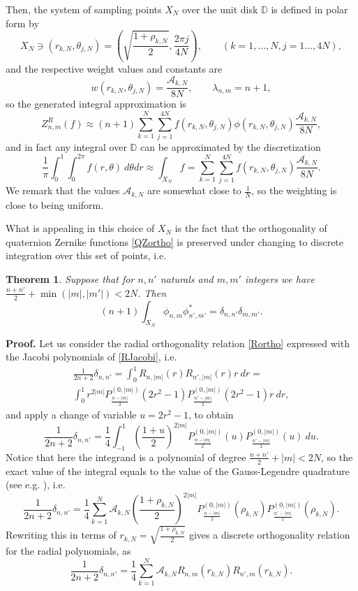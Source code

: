 \documentclass[12pt]{article}
\newtheorem{theorem}{\noindent Theorem}
\newcommand{\D}{\mathbb{D}}
\begin{document}
Then, the system of sampling points $X_N$ over the unit disk $\D$ is defined in polar form by
\[
	X_N\ni (r_{k,N}, \theta_{j,N}) = \left(\sqrt{\frac{1+\rho_{k,N}}{2}} , \frac{2\pi j}{4N} \right), \qquad (k=1,\ldots,N,j=1\ldots,4N),
\]
and the respective weight values and constants are
\[
	w(r_{k,N},\theta_{j,N}) = \frac{\mathcal{A}_{k,N}}{8N},\qquad \lambda_{n,m} = n+1,
\]
so the generated integral approximation is
\[
	Z_{n,m}^R(f) \approx (n+1) \sum_{k=1}^{N} \sum_{j=1}^{4N} f(r_{k,N},\theta_{j,N}) \phi(r_{k,N},\theta_{j,N}) \frac{\mathcal{A}_{k,N}}{8N},
\]
and in fact any integral over $\D$ can be approximated by the discretization
\[
	\frac{1}{\pi} \int_{0}^1 \int_0^{2\pi} f(r,\theta)\ d\theta dr \approx \int_{X_N} f = \sum_{k=1}^{N} \sum_{j=1}^{4N} f(r_{k,N},\theta_{j,N}) \frac{\mathcal{A}_{k,N}}{8N}.
\]
We remark that the values $\mathcal{A}_{k,N}$ are somewhat close to $\frac{1}{N}$, so the weighting is close to being uniform.

What is appealing in this choice of $X_N$ is the fact that the orthogonality of quaternion Zernike functions \eqref{QZortho} is preserved under changing to  discrete integration over this set of points, i.e.
\begin{theorem}\label{QZdisc-ortho}
Suppose that for $n,n'$ naturals and $m,m'$ integers we have $\frac{n+n'}{2}+\min(|m|,|m'|) < 2N$. Then
\[
	(n+1) \int_{X_N} \phi_{n,m} \phi^*_{n',m'} =\delta_{n,n'}\delta_{m,m'}.
\]
\end{theorem}
\noindent\textbf{Proof.}
Let us consider the radial orthogonality relation \eqref{Rortho} expressed with the Jacobi polynomials of \eqref{RJacobi}, i.e.
\[
\begin{gathered}
	\frac{1}{2n+2} \delta_{n,n'} = \int_0^1 R_{n,|m|}(r) R_{n',|m|}(r)r\ dr  = \\
	\int_0^1 r^{2|m|} P_{\frac{n - |m|}{2}}^{(0,|m|)}(2r^2-1) P_{\frac{n' - |m|}{2}}^{(0,|m|)}(2r^2-1) r\ dr,
\end{gathered}
\]
and apply a change of variable $u=2r^2-1$, to obtain
\[
	\frac{1}{2n+2} \delta_{n,n'} = \frac{1}{4} \int_{-1}^1 \left(\frac{1+u}{2}\right)^{2|m|} P_{\frac{n - |m|}{2}}^{(0,|m|)}(u) P_{\frac{n' - |m|}{2}}				^{(0,|m|)}(u)\ du.
\]
Notice that here the integrand is a polynomial of degree $\frac{n+n'}{2}+|m| < 2N$, so the exact value of the integral equals to the value of the Gauss-Legendre quadrature (see e.g. \cite{Szego}), i.e.
\[
	\frac{1}{2n+2} \delta_{n,n'} = \frac{1}{4} \sum_{k=1}^{N} \mathcal{A}_{k,N} \left(\frac{1+\rho_{k,N}}{2}\right)^{2|m|} P_{\frac{n - |m|}{2}}				^{(0,|m|)}(\rho_{k,N}) P_{\frac{n' - |m|}{2}}^{(0,|m|)}(\rho_{k,N}).
\]
Rewriting this in terms of $r_{k,N} = \sqrt{\frac{1+\rho_{k,N}}{2}}$ gives a discrete orthogonality relation for the radial polynomials, as
\begin{equation}\label{Rdisc-ortho}
	\frac{1}{2n+2} \delta_{n,n'} = \frac{1}{4} \sum_{k=1}^{N} \mathcal{A}_{k,N} R_{n,m}(r_{k,N}) R_{n',m}(r_{k,N}).
\end{equation}
\end{document}
